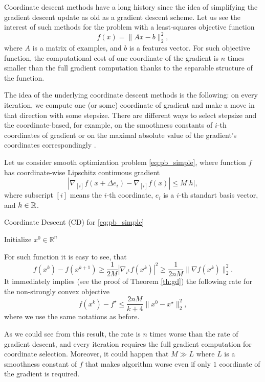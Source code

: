 Coordinate descent methods have a long history since the idea of simplifying the gradient descent update as old as a gradient descent scheme. Let us see the interest of such methods for the problem with a least-squares objective function
$$
f(x) = \|Ax-b\|_2^2,
$$
where $A$ is a matrix of examples, and $b$ is a features vector. For such objective function, the computational cost of one coordinate of the gradient is $n$ times smaller than the full gradient computation thanks to the separable structure of the function.

The idea of the underlying coordinate descent methods is the following: on every iteration, we compute one (or some) coordinate of gradient and make a move in that direction with some stepsize. There are different ways to select stepsize and the coordinate-based, for example, on the smoothness constants of $i$-th coordinates of gradient \cite{richtarik2012efficient} or on the maximal absolute value of the gradient's coordinates correspondingly \cite{nesterov2012efficiency}. 

Let us consider smooth optimization problem \eqref{eq:pb_simple}, where function $f$ has coordinate-wise Lipschitz continuous gradient
$$
|\nabla_{[i]} f(x+\Delta e_i) - \nabla_{[i]} f(x)|\leq M|h|,
$$
where subscript $[i]$ means the $i$-th coordinate, $e_i$ is a $i$-th standart basis vector, and $h\in\mathbb{R}$.
\begin{algorithm}
    \caption{Coordinate Descent (CD) for \eqref{eq:pb_simple}}
    \label{algo:cd}
    \begin{algorithmic}
        \STATE Initialize $x^0\in\mathbb{R}^n$
        \ENDFOR
    \end{algorithmic}
\end{algorithm}
For such function it is easy to see, that
$$
f(x^{k}) - f(x^{k+1})\geq \frac{1}{2M}|\nabla_{i^k} f(x^k)|^2\geq \frac{1}{2nM}\|\nabla f(x^k)\|_2^2.
$$
It immediately implies (see the proof of Theorem \ref{th:gd}) the following rate for the non-strongly convex objective
$$
f(x^k) - f^\star\leq \frac{2nM}{k+4}\|x^0-x^\star\|_2^2,
$$
where we use the same notations as before. 

As we could see from this result, the rate is $n$ times worse than the rate of gradient descent, and every iteration requires the full gradient computation for coordinate selection. Moreover, it could happen that $M\gg L$ where $L$ is a smoothness constant of $f$ that makes algorithm worse even if only $1$ coordinate of the gradient is required.

